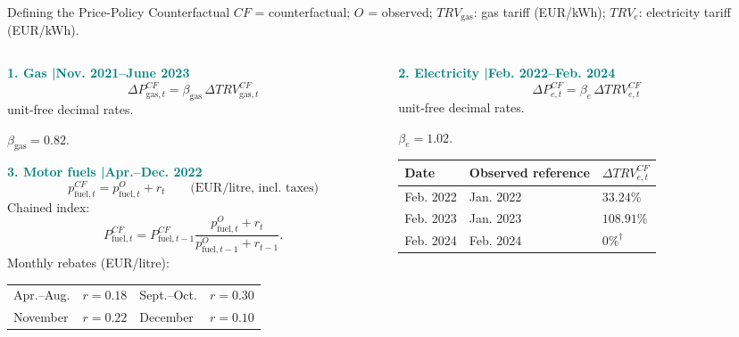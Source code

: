 \documentclass[11pt,aspectratio=169]{beamer}
\begin{document}
\begin{frame}{Defining the Price-Policy Counterfactual}
\scriptsize\setlength{\abovedisplayskip}{1pt}\setlength{\belowdisplayskip}{1pt}\setlength{\abovedisplayshortskip}{2pt}\setlength{\belowdisplayshortskip}{2pt}
\textcolor{WarmGray}{$CF$ = counterfactual; $O$ = observed; $TRV_{\mathrm{gas}}$: gas tariff (EUR/kWh); $TRV_e$: electricity tariff (EUR/kWh).}\par
\par\vspace{0.5em}
\begin{columns}[T,onlytextwidth]
\begin{column}{0.48\textwidth}
\textcolor{Teal}{\textbf{1. Gas \enspace|\enspace Nov. 2021--June 2023}}
\[
\boxed{\Delta P_{\mathrm{gas},t}^{CF}=\beta_{\mathrm{gas}}\,\Delta TRV_{\mathrm{gas},t}^{CF}}
\]
{\color{WarmGray}unit-free decimal rates.}\par

$\beta_{\mathrm{gas}}=0.82$.
\par\vspace{0.5em}
\textcolor{Teal}{\textbf{3. Motor fuels \enspace|\enspace Apr.--Dec. 2022}}
\[
\boxed{p_{\mathrm{fuel},t}^{CF}=p_{\mathrm{fuel},t}^{O}+r_t}
\qquad\text{(EUR/litre, incl. taxes)}
\]
Chained index:
\[
P_{\mathrm{fuel},t}^{CF}=P_{\mathrm{fuel},t-1}^{CF}
\frac{p_{\mathrm{fuel},t}^{O}+r_t}{p_{\mathrm{fuel},t-1}^{O}+r_{t-1}}.
\]
Monthly rebates (EUR/litre):
\par\smallskip
\begin{tabular}{@{}lr@{\qquad}lr@{}}
Apr.--Aug. & $r=0.18$ & Sept.--Oct. & $r=0.30$\\
November & $r=0.22$ & December & $r=0.10$
\end{tabular}
\par\smallskip

\end{column}
\begin{column}{0.49\textwidth}
\textcolor{Teal}{\textbf{2. Electricity \enspace|\enspace Feb. 2022--Feb. 2024}}
\[
\boxed{\Delta P_{e,t}^{CF}=\beta_e\,\Delta TRV_{e,t}^{CF}}
\]
{\color{WarmGray}unit-free decimal rates.}\par

$\beta_e=1.02$.
\par\smallskip
\begin{tabular}{@{}lll@{}}
\toprule
Date & Observed reference & $\Delta TRV_{e,t}^{CF}$\\
\midrule
Feb. 2022 & Jan. 2022 & $33.24\%$\\
Feb. 2023 & Jan. 2023 & $108.91\%$\\
Feb. 2024 & Feb. 2024 & $0\%^{\dagger}$\\
\bottomrule
\end{tabular}
\par\smallskip


\end{column}
\end{columns}
\end{frame}
\end{document}
